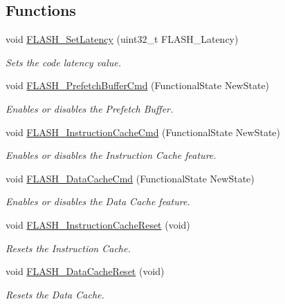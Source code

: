 \subsection*{Functions}
\begin{DoxyCompactItemize}
\item 
void \hyperlink{group___f_l_a_s_h_ga54bcb96270215c752c3479c8c9e438c0}{F\-L\-A\-S\-H\-\_\-\-Set\-Latency} (uint32\-\_\-t F\-L\-A\-S\-H\-\_\-\-Latency)
\begin{DoxyCompactList}\small\item\em Sets the code latency value. \end{DoxyCompactList}\item 
void \hyperlink{group___f_l_a_s_h_gafaa24b6176b587bdda46abbe755af986}{F\-L\-A\-S\-H\-\_\-\-Prefetch\-Buffer\-Cmd} (Functional\-State New\-State)
\begin{DoxyCompactList}\small\item\em Enables or disables the Prefetch Buffer. \end{DoxyCompactList}\item 
void \hyperlink{group___f_l_a_s_h_ga7d5a9a35e792d844c329d7f1656b50ae}{F\-L\-A\-S\-H\-\_\-\-Instruction\-Cache\-Cmd} (Functional\-State New\-State)
\begin{DoxyCompactList}\small\item\em Enables or disables the Instruction Cache feature. \end{DoxyCompactList}\item 
void \hyperlink{group___f_l_a_s_h_ga937a824493f3c6949289401a767a0360}{F\-L\-A\-S\-H\-\_\-\-Data\-Cache\-Cmd} (Functional\-State New\-State)
\begin{DoxyCompactList}\small\item\em Enables or disables the Data Cache feature. \end{DoxyCompactList}\item 
void \hyperlink{group___f_l_a_s_h_gaf6f1e54d9df32f3c196d67e59eb80a49}{F\-L\-A\-S\-H\-\_\-\-Instruction\-Cache\-Reset} (void)
\begin{DoxyCompactList}\small\item\em Resets the Instruction Cache. \end{DoxyCompactList}\item 
void \hyperlink{group___f_l_a_s_h_ga8332da89b072373b7f116e0b7c137a22}{F\-L\-A\-S\-H\-\_\-\-Data\-Cache\-Reset} (void)
\begin{DoxyCompactList}\small\item\em Resets the Data Cache. \end{DoxyCompactList}\item 

\end{DoxyCompactItemize}

